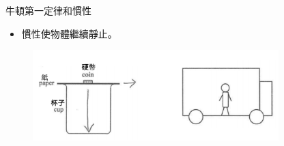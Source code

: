 \documentclass[beamer=true]{standalone}
\begin{document}
\begin{frame}{牛頓第一定律和慣性}
    \begin{itemize}
        \item 慣性使物體繼續靜止。
    \end{itemize}
    \begin{figure}[h!]
        \centering
        \includegraphics[width=0.85\textwidth]{assets/d5349655.png}
    \end{figure}
\end{frame}
\end{document}
